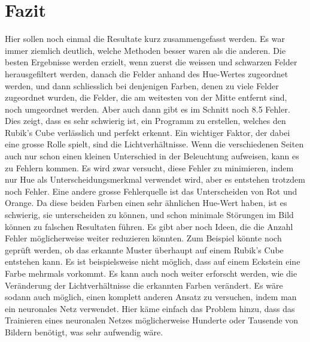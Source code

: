 \documentclass[a4paper, 12pt]{article}
\begin{document}
\section{Fazit}
Hier sollen noch einmal die Resultate kurz zusammengefasst werden. Es war immer ziemlich deutlich, welche Methoden besser waren als die anderen. Die besten Ergebnisse werden erzielt, wenn zuerst die weissen und schwarzen Felder herausgefiltert werden, danach die Felder anhand des Hue-Wertes zugeordnet werden, und dann schliesslich bei denjenigen Farben, denen zu viele Felder zugeordnet wurden, die Felder, die am weitesten von der Mitte entfernt sind, noch umgeordnet werden.
\newline
Aber auch dann gibt es im Schnitt noch 8.5 Fehler. Dies zeigt, dass es sehr schwierig ist, ein Programm zu erstellen, welches den Rubik's Cube verlässlich und perfekt erkennt. Ein wichtiger Faktor, der dabei eine grosse Rolle spielt, sind die Lichtverhältnisse. Wenn die verschiedenen Seiten auch nur schon einen kleinen Unterschied in der Beleuchtung aufweisen, kann es zu Fehlern kommen. Es wird zwar versucht, diese Fehler zu minimieren, indem nur Hue als Unterscheidungsmerkmal verwendet wird, aber es entstehen trotzdem noch Fehler. Eine andere grosse Fehlerquelle ist das Unterscheiden von Rot und Orange. Da diese beiden Farben einen sehr ähnlichen Hue-Wert haben, ist es schwierig, sie unterscheiden zu können, und schon minimale Störungen im Bild können zu falschen Resultaten führen.
\newline
Es gibt aber noch Ideen, die die Anzahl Fehler möglicherweise weiter reduzieren könnten. Zum Beispiel könnte noch geprüft werden, ob das erkannte Muster überhaupt auf einem Rubik's Cube entstehen kann. Es ist beispielsweise nicht möglich, dass auf einem Eckstein eine Farbe mehrmals vorkommt. Es kann auch noch weiter erforscht werden, wie die Veränderung der Lichtverhältnisse die erkannten Farben verändert. Es wäre sodann auch möglich, einen komplett anderen Ansatz zu versuchen, indem man ein neuronales Netz verwendet. Hier käme einfach das Problem hinzu, dass das Trainieren eines neuronalen Netzes möglicherweise Hunderte oder Tausende von Bildern benötigt, was sehr aufwendig wäre.
\newpage
\printbibliography[heading=bibnumbered]
\end{document}
